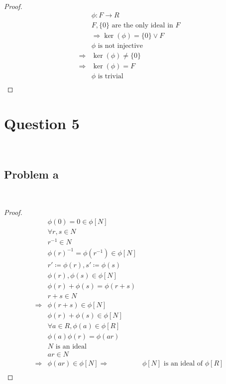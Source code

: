 \documentclass{article}
\begin{document}
~

\begin{proof}
    \begin{align*}
        &\phi:F\rightarrow R\\
        &F,\{0\}\text{ are the only ideal in }F\\
        &\Rightarrow \ker(\phi)=\{0\}\lor F\\
        &\phi\text{ is not injective}\\
        \Rightarrow & \ker(\phi)\ne\{0\}\\
        \Rightarrow &\ker(\phi)=F\\
        &\phi\text{ is trivial}\\
    \end{align*}
\end{proof}

\newpage

\section*{Question 5}

~

\subsection*{Problem a}

~

\begin{proof}
    \begin{align*}
        &\phi(0)=0\in\phi[N]\\
        &\forall r,s\in N\\
        &r^{-1}\in N\\
        &\phi(r)^{-1}=\phi(r^{-1})\in\phi[N]\\
        &r'\coloneqq \phi(r),s'\coloneqq \phi(s)\\
        &\phi(r),\phi(s)\in \phi[N]\\
        &\phi(r)+\phi(s)=\phi(r+s)\\
        &r+s\in N\\
        \Rightarrow&\phi(r+s)\in\phi[N]\\
        &\phi(r)+\phi(s)\in\phi[N]\\
        &\forall a\in R,\phi(a)\in\phi[R]\\
        &\phi(a)\phi(r)=\phi(ar)\\
        &N\text{ is an ideal}\\
        &ar\in N\\
        \Rightarrow&\phi(ar)\in \phi[N]
        \Rightarrow&\phi[N]\text{ is an ideal of }\phi[R]\\
    \end{align*}
\end{proof}
\end{document}
